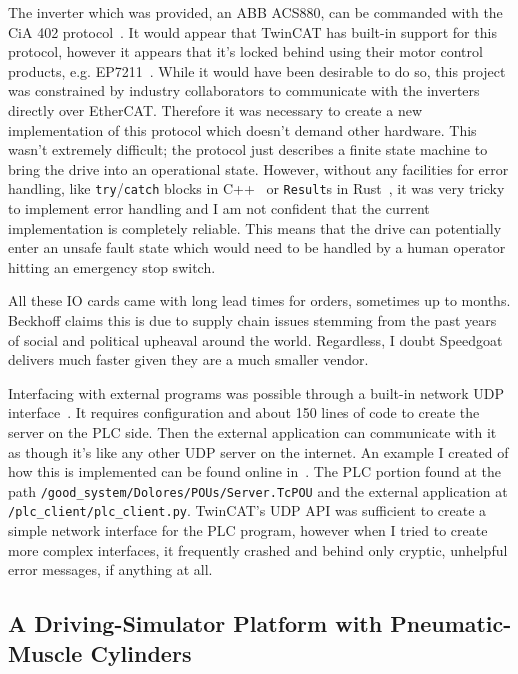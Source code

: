 \documentclass[english,12pt,a4paper,pdftex,eng,utf8]{aaltothesis}
\begin{document}
The inverter which was provided, an ABB ACS880, can be commanded with the CiA 402 protocol~\cite{ACS880, CiA402}.  It would appear that TwinCAT has built-in support for this protocol, however it appears that it's locked behind using their motor control products, e.g. EP7211~\cite{EP7211}.  While it would have been desirable to do so, this project was constrained by industry collaborators to communicate with the inverters directly over EtherCAT.  Therefore it was necessary to create a new implementation of this protocol which doesn't demand other hardware.  This wasn't extremely difficult; the protocol just describes a finite state machine to bring the drive into an operational state.  However, without any facilities for error handling, like \verb|try|/\verb|catch| blocks in C++~\cite{CppTryCatch} or \verb|Result|s in Rust~\cite{RustResult}, it was very tricky to implement error handling and I am not confident that the current implementation is completely reliable.  This means that the drive can potentially enter an unsafe fault state which would need to be handled by a human operator hitting an emergency stop switch.

All these IO cards came with long lead times for orders, sometimes up to months.  Beckhoff claims this is due to supply chain issues stemming from the past years of social and political upheaval around the world.  Regardless, I doubt Speedgoat delivers much faster given they are a much smaller vendor.

Interfacing with external programs was possible through a built-in network UDP interface~\cite{BeckhoffTcpUdpRealtime}.  It requires configuration and about 150 lines of code to create the server on the PLC side.  Then the external application can communicate with it as though it's like any other UDP server on the internet.  An example I created of how this is implemented can be found online in~\cite{PorterGoodPlc}.  The PLC portion found at the path \verb|/good_system/Dolores/POUs/Server.TcPOU| and the external application at \verb|/plc_client/plc_client.py|.  TwinCAT's UDP API was sufficient to create a simple network interface for the PLC program, however when I tried to create more complex interfaces, it frequently crashed and behind only cryptic, unhelpful error messages, if anything at all.

\subsection{A Driving-Simulator Platform with Pneumatic-Muscle Cylinders}
\end{document}
